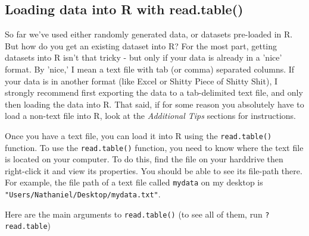 \documentclass{tufte-book}\usepackage[]{graphicx}\usepackage[]{color}
\newcommand{\newfun}[1]{\begin{LARGE} \begin{center} \texttt{#1} \end{center} \end{LARGE}}
\begin{document}
\begin{footnotesize}
\section{Loading data into R with read.table()}

So far we've used either randomly generated data, or datasets pre-loaded in R. But how do you get an existing dataset into R? For the most part, getting datasets into R isn't that tricky - but only if your data is already in a 'nice' format. By 'nice,' I mean a text file with tab (or comma) separated columns. If your data is in another format (like Excel or Shitty Piece of Shitty Shit), I strongly recommend first exporting the data to a tab-delimited text file, and only then loading the data into R. That said, if for some reason you absolutely have to load a non-text file into R, look at the \textit{Additional Tips} sections for instructions.

Once you have a text file, you can load it into R using the \texttt{read.table()} function. To use the \texttt{read.table()} function, you need to know where the text file is located on your computer. To do this, find the file on your harddrive then right-click it and view its properties. You should be able to see its file-path there. For example, the file path of a text file called \texttt{mydata} on my desktop is \texttt{"Users/Nathaniel/Desktop/mydata.txt"}.

Here are the main arguments to \texttt{read.table()} (to see all of them, run \texttt{?read.table})



\vspace{5mm} %
\noindent
\setlength{\fboxrule}{1.5pt}
\fbox{
\parbox{\textwidth}{

\newfun{read.table()}\index{readltab.e()}

\hline

\begin{description}


\end{description}}}
\end{footnotesize}
\end{document}
